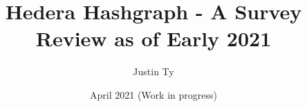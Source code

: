 \documentclass{article}
\begin{document}

\author{Justin Ty}
\title{Hedera Hashgraph - A Survey Review as of Early 2021}
\date{April 2021 (Work in progress)}

\maketitle







\printbibliography

\end{document}
